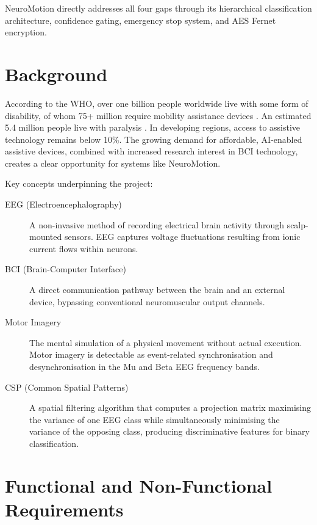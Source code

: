 \documentclass[12pt, a4paper, oneside]{report}
\begin{document}
NeuroMotion directly addresses all four gaps through its hierarchical classification
architecture, confidence gating, emergency stop system, and AES Fernet encryption.

\section{Background}

According to the WHO, over one billion people worldwide live with some form of disability,
of whom 75+ million require mobility assistance devices \cite{who2023}. An estimated
5.4 million people live with paralysis \cite{nscisc2021}. In developing regions, access to
assistive technology remains below 10\%. The growing demand for affordable, AI-enabled
assistive devices, combined with increased research interest in BCI technology, creates a
clear opportunity for systems like NeuroMotion.

Key concepts underpinning the project:

\begin{description}
    \item[EEG (Electroencephalography)] A non-invasive method of recording electrical
    brain activity through scalp-mounted sensors. EEG captures voltage fluctuations
    resulting from ionic current flows within neurons.

    \item[BCI (Brain-Computer Interface)] A direct communication pathway between the
    brain and an external device, bypassing conventional neuromuscular output channels.

    \item[Motor Imagery] The mental simulation of a physical movement without actual
    execution. Motor imagery is detectable as event-related synchronisation and
    desynchronisation in the Mu and Beta EEG frequency bands.

    \item[CSP (Common Spatial Patterns)] A spatial filtering algorithm that computes a
    projection matrix maximising the variance of one EEG class while simultaneously
    minimising the variance of the opposing class, producing discriminative features for
    binary classification.
\end{description}

\section{Functional and Non-Functional Requirements}
\end{document}
